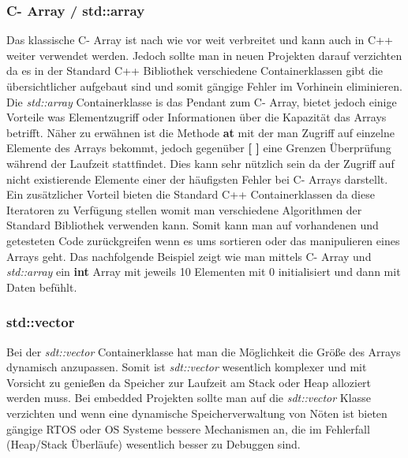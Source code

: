 \documentclass[MES,Master,ngerman]{twbook}%
\begin{document}
\subsubsection{C- Array / std::array}
Das klassische C- Array ist nach wie vor weit verbreitet und kann auch in C++ weiter verwendet werden. Jedoch sollte man in neuen Projekten darauf verzichten da es in der Standard C++ Bibliothek verschiedene Containerklassen gibt die übersichtlicher aufgebaut sind und somit gängige Fehler im Vorhinein eliminieren. Die \textit{std::array} Containerklasse is das Pendant zum C- Array, bietet jedoch einige Vorteile was Elementzugriff oder Informationen über die Kapazität das Arrays betrifft. Näher zu erwähnen ist die Methode \textbf{at} mit der man Zugriff auf einzelne Elemente des Arrays bekommt, jedoch gegenüber \textbf{[ ]} eine Grenzen Überprüfung während der Laufzeit stattfindet. Dies kann sehr nützlich sein da der Zugriff auf nicht existierende Elemente einer der häufigsten Fehler bei C- Arrays darstellt. \newline \newline Ein zusätzlicher Vorteil bieten die Standard C++ Containerklassen da diese Iteratoren zu Verfügung stellen womit man verschiedene Algorithmen der Standard Bibliothek verwenden kann. Somit kann man auf vorhandenen und getesteten Code zurückgreifen wenn es ums sortieren oder das manipulieren eines Arrays geht. \newline \newline Das nachfolgende Beispiel zeigt wie man mittels C- Array und \textit{std::array} ein \textbf{int} Array mit jeweils 10 Elementen mit 0 initialisiert und dann mit Daten befühlt.


\begin{figure}[!htb]
	\begin{subfigure}[b]{0.5\textwidth}
		
		\label{fig:5}
	\end{subfigure}
	\begin{subfigure}[b]{0.5\textwidth}
		
		\label{fig:6}
	\end{subfigure}
\end{figure}

\subsubsection{std::vector}
Bei der \textit{sdt::vector} Containerklasse hat man die Möglichkeit die Größe des Arrays dynamisch anzupassen. Somit ist \textit{sdt::vector} wesentlich komplexer und mit Vorsicht zu genießen da Speicher zur Laufzeit am Stack oder Heap alloziert werden muss. Bei embedded Projekten sollte man auf die \textit{sdt::vector} Klasse verzichten und wenn eine dynamische Speicherverwaltung von Nöten ist bieten gängige RTOS oder OS Systeme bessere Mechanismen an, die im Fehlerfall (Heap/Stack Überläufe) wesentlich besser zu Debuggen sind.
\end{document}

